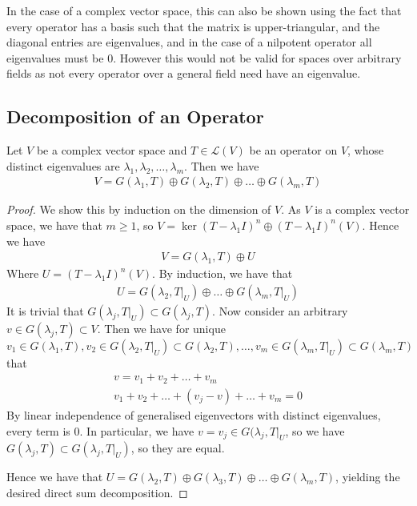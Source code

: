 \documentclass[]{article}
\begin{document}
In the case of a complex vector space, this can also be shown using the fact that every operator has a basis such that the matrix is upper-triangular, and the diagonal entries are eigenvalues, and in the case of a nilpotent operator all eigenvalues must be $0$. However this would not be valid for spaces over arbitrary fields as not every operator over a general field need have an eigenvalue.

\subsection{Decomposition of an Operator}

\begin{thm}
		Let $V$ be a complex vector space and $T \in \mathcal{L}(V)$ be an operator on $V$, whose distinct eigenvalues are $\lambda_1, \lambda_2, \ldots, \lambda_m$. Then we have
		\begin{align*}
				V = G(\lambda_1, T) \oplus G(\lambda_2, T) \oplus \ldots \oplus G(\lambda_m, T)	
		\end{align*}
\end{thm}

\begin{proof}
		We show this by induction on the dimension of $V$. As $V$ is a complex vector space, we have that $m \geq 1$, so $V = \ker(T - \lambda_1 I)^n \oplus (T - \lambda_1 I)^n(V)$. Hence we have
		\begin{align*}
				V = G(\lambda_1, T) \oplus U
		\end{align*}
		Where $U = (T - \lambda_1 I)^n(V)$. By induction, we have that
		\begin{align*}
				U = G(\lambda_2, T|_U) \oplus \ldots \oplus G(\lambda_m, T|_U)
		\end{align*}
		It is trivial that $G(\lambda_j, T|_U) \subset G(\lambda_j, T)$. Now consider an arbitrary $v \in G(\lambda_j, T) \subset V$. Then we have for unique $v_1 \in G(\lambda_1, T), v_2 \in G(\lambda_2, T|_U) \subset G(\lambda_2, T), \ldots, v_m \in G(\lambda_m, T|_U) \subset G(\lambda_m, T)$ that
		\begin{align*}
			v = v_1 + v_2 + \ldots + v_m \\
			v_1 + v_2 + \ldots + (v_j - v) + \ldots + v_m = 0 
		\end{align*}
		By linear independence of generalised eigenvectors with distinct eigenvalues, every term is $0$. In particular, we have $v = v_j \in G(\lambda_j, T|_U$, so we have $G(\lambda_j, T) \subset G(\lambda_j, T|_U)$, so they are equal.

		Hence we have that $U = G(\lambda_2, T) \oplus G(\lambda_3, T) \oplus \ldots \oplus G(\lambda_m, T)$, yielding the desired direct sum decomposition.
\end{proof}
\end{document}
